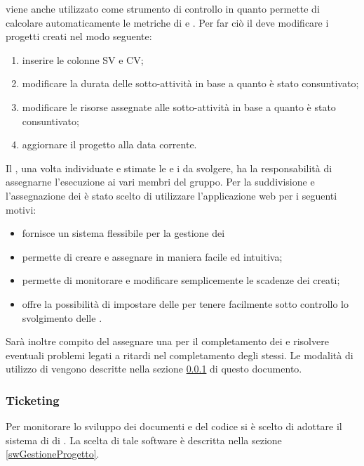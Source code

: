 \documentclass[12pt,a4paper]{article}
\begin{document}
 viene anche utilizzato come strumento di controllo in quanto permette di calcolare automaticamente le metriche di  e . Per far ciò il \RE deve modificare i progetti creati nel modo seguente:
\begin{enumerate}
	\item inserire le colonne SV e CV;
	\item modificare la durata delle sotto-attività in base a quanto è stato consuntivato;
	\item modificare le risorse assegnate alle sotto-attività in base a quanto è stato consuntivato;
	\item aggiornare il progetto alla data corrente.
\end{enumerate}

\label{swGestioneProgetto}
Il \PM{}, una volta individuate e stimate le  e i  da svolgere, ha la responsabilità di assegnarne l'esecuzione ai vari membri del gruppo. Per la suddivisione e l'assegnazione dei  è stato scelto di utilizzare l'applicazione web  per i seguenti motivi: 
\begin{itemize}
	\item fornisce un sistema flessibile per la gestione dei 
	\item permette di creare e assegnare  in maniera facile ed intuitiva; 
	\item permette di monitorare e modificare semplicemente le scadenze dei  creati;
	\item offre la possibilità di impostare delle  per tenere facilmente sotto controllo lo svolgimento delle .
\end{itemize}
Sarà inoltre compito del \PM{} assegnare una  per il completamento dei  e risolvere eventuali problemi legati a ritardi nel completamento degli stessi.
Le modalità di utilizzo di  vengono descritte nella sezione \ref{ticket} di questo documento.

\subsubsection{Ticketing}\label{ticket} %
Per monitorare lo sviluppo dei documenti e del codice si è scelto di adottare il sistema di  di . La scelta di tale software è descritta nella sezione \ref{swGestioneProgetto}.
\end{document}
